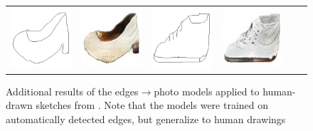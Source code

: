 \begin{figure}
\begin{center}
\begin{tabular}{cccccc}
\includegraphics[width=0.167\linewidth]{figs/shoes_sketches_lotsofresults_latex/input_14983.jpg} &
\includegraphics[width=0.167\linewidth]{figs/shoes_sketches_lotsofresults_latex/L1cGAN_14983.jpg} \hspace{0.025in} &
\includegraphics[width=0.167\linewidth]{figs/shoes_sketches_lotsofresults_latex/input_14971.jpg} &
\includegraphics[width=0.167\linewidth]{figs/shoes_sketches_lotsofresults_latex/L1cGAN_14971.jpg}

\end{tabular} \egroup 
\end{center}
\caption{Additional results of the edges$\rightarrow$photo models applied to human-drawn sketches from \cite{eitz2012humans}. Note that the models were trained on automatically detected edges, but generalize to human drawings}
\label{sketches_lotsofresults}
\end{figure}
